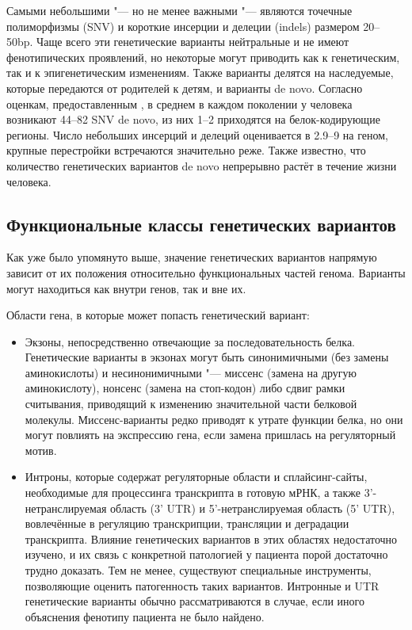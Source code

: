 \documentclass[a4paper,12pt]{article}
\begin{document}
Самыми небольшими "--- но не менее важными "--- являются точечные полиморфизмы (SNV) и короткие инсерции и делеции (indels) размером 20--50bp.
Чаще всего эти генетические варианты нейтральные и не имеют фенотипических проявлений, но некоторые могут приводить как к генетическим, так и к эпигенетическим изменениям.
Также варианты делятся на наследуемые, которые передаются от родителей к детям, и варианты de novo.
Согласно оценкам, предоставленным \cite{Acuna_Hidalgo_2016}, в среднем в каждом поколении у человека возникают 44--82 SNV de novo, из них 1--2 приходятся на белок-кодирующие регионы.
Число небольших инсерций и делеций оценивается в 2.9--9 на геном, крупные перестройки встречаются значительно реже.
Также известно, что количество генетических вариантов de novo непрерывно растёт в течение жизни человека.

\subsection{Функциональные классы генетических вариантов}

Как уже было упомянуто выше, значение генетических вариантов напрямую зависит от их положения относительно функциональных частей генома.
Варианты могут находиться как внутри генов, так и вне их.

Области гена, в которые может попасть генетический вариант:

\begin{itemize}
\item Экзоны, непосредственно отвечающие за последовательность белка.
Генетические варианты в экзонах могут быть синонимичными (без замены аминокислоты) и несинонимичными "--- миссенс (замена на другую аминокислоту), нонсенс (замена на стоп-кодон) либо сдвиг рамки считывания, приводящий к изменению значительной части белковой молекулы.
Миссенс-варианты редко приводят к утрате функции белка, но они могут повлиять на экспрессию гена, если замена пришлась на регуляторный мотив\cite{j_Brea_Fernandez_2011}.
\item Интроны, которые содержат регуляторные области и сплайсинг-сайты, необходимые для процессинга транскрипта в готовую мРНК, а также 3'-нетранслируемая область (3' UTR) и 5'-нетранслируемая область (5' UTR), вовлечённые в регуляцию транскрипции, трансляции и деградации транскрипта.
Влияние генетических вариантов в этих областях недостаточно изучено, и их связь с конкретной патологией у пациента порой достаточно трудно доказать.
Тем не менее, существуют специальные инструменты, позволяющие оценить патогенность таких вариантов.
Интронные и UTR генетические варианты обычно рассматриваются в случае, если иного объяснения фенотипу пациента не было найдено.
\end{itemize}
\end{document}
